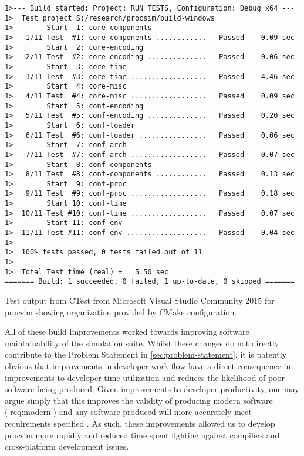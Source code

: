 \begin{listing}[hb!]
\begin{verbatim}
1>--- Build started: Project: RUN_TESTS, Configuration: Debug x64 ---
1>  Test project S:/research/procsim/build-windows
1>        Start  1: core-components
1>   1/11 Test  #1: core-components ............   Passed    0.09 sec
1>        Start  2: core-encoding
1>   2/11 Test  #2: core-encoding ..............   Passed    0.06 sec
1>        Start  3: core-time
1>   3/11 Test  #3: core-time ..................   Passed    4.46 sec
1>        Start  4: core-misc
1>   4/11 Test  #4: core-misc ..................   Passed    0.09 sec
1>        Start  5: conf-encoding
1>   5/11 Test  #5: conf-encoding ..............   Passed    0.20 sec
1>        Start  6: conf-loader
1>   6/11 Test  #6: conf-loader ................   Passed    0.06 sec
1>        Start  7: conf-arch
1>   7/11 Test  #7: conf-arch ..................   Passed    0.07 sec
1>        Start  8: conf-components
1>   8/11 Test  #8: conf-components ............   Passed    0.13 sec
1>        Start  9: conf-proc
1>   9/11 Test  #9: conf-proc ..................   Passed    0.18 sec
1>        Start 10: conf-time
1>  10/11 Test #10: conf-time ..................   Passed    0.07 sec
1>        Start 11: conf-env
1>  11/11 Test #11: conf-env ...................   Passed    0.04 sec
1>
1>  100% tests passed, 0 tests failed out of 11
1>
1>  Total Test time (real) =   5.50 sec
======= Build: 1 succeeded, 0 failed, 1 up-to-date, 0 skipped =======
\end{verbatim}
\caption{Test output from CTest \cite{CMake:CTest} from Microsoft Visual Studio Community 2015 for procsim showing organization provided by CMake configuration.}
\label{lst:cross-platform:ctest-output}
\end{listing}  

All of these build improvements worked towards improving software maintainability of the simulation suite. Whilst these changes do not directly contribute to the Problem Statement in \cref{sec:problem-statement}, it is patently obvious that improvements in developer work flow have a direct consequence in improvements to developer time utilization and reduces the likelihood of poor software being produced. Given improvements to developer productivity, one may argue simply that this improves the validity of producing modern software (\cref{req:modern}) and any software produced will more accurately meet requirements specified \cite{Solis2011}. As such, these improvements allowed us to develop procsim more rapidly and reduced time spent fighting against compilers and cross-platform development issues.